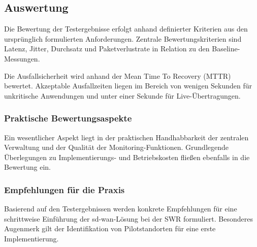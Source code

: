 \subsection*{Auswertung}
Die Bewertung der Testergebnisse erfolgt anhand definierter Kriterien aus den ursprünglich formulierten Anforderungen. Zentrale Bewertungskriterien sind Latenz, Jitter, Durchsatz und Paketverlustrate in Relation zu den Baseline-Messungen.

Die Ausfallsicherheit wird anhand der Mean Time To Recovery (MTTR) bewertet. Akzeptable Ausfallzeiten liegen im Bereich von wenigen Sekunden für unkritische Anwendungen und unter einer Sekunde für Live-Übertragungen.

\subsubsection*{Praktische Bewertungsaspekte}

Ein wesentlicher Aspekt liegt in der praktischen Handhabbarkeit der zentralen Verwaltung und der Qualität der Monitoring-Funktionen. Grundlegende Überlegungen zu Implementierungs- und Betriebskosten fließen ebenfalls in die Bewertung ein.

\subsubsection*{Empfehlungen für die Praxis}

Basierend auf den Testergebnissen werden konkrete Empfehlungen für eine schrittweise Einführung der \ac{sd-wan}-Lösung bei der SWR formuliert. Besonderes Augenmerk gilt der Identifikation von Pilotstandorten für eine erste Implementierung.
